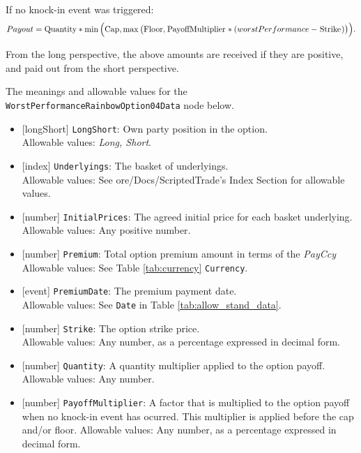 If no knock-in event was triggered:
\begin{equation*}
  Payout = \text{\lstinline!Quantity!} * \min\Big(\text{\lstinline!Cap!}, \max\big(\text{\lstinline!Floor!}, \text{\lstinline!PayoffMultiplier!} * (worstPerformance - \text{\lstinline!Strike!})\big)\Big).
\end{equation*}

From the long perspective, the above amounts are received if they are positive,
and paid out from the short perspective.

The meanings and allowable values for the \lstinline!WorstPerformanceRainbowOption04Data! node below.

\begin{itemize}
  \item{}[longShort] \lstinline!LongShort!: Own party position in the option. \\
  Allowable values: \emph{Long, Short}.
  \item{}[index] \lstinline!Underlyings!: The basket of underlyings. \\
  Allowable values: See ore/Docs/ScriptedTrade's Index Section for allowable values.
  \item{}[number] \lstinline!InitialPrices!: The agreed initial price for each basket underlying. \\
  Allowable values: Any positive number.
  \item{}[number] \lstinline!Premium!: Total option premium amount in terms of the \emph{PayCcy} \\
  Allowable values: See Table \ref{tab:currency} \lstinline!Currency!.
  \item{}[event] \lstinline!PremiumDate!: The premium payment date. \\
  Allowable values: See \lstinline!Date! in Table \ref{tab:allow_stand_data}.
  \item{}[number] \lstinline!Strike!: The option strike price. \\
  Allowable values: Any number, as a percentage expressed in decimal form.
  \item{}[number] \lstinline!Quantity!: A quantity multiplier applied to the option payoff. \\
  Allowable values: Any number.
  \item{}[number] \lstinline!PayoffMultiplier!: A factor that is multiplied to the option payoff when no knock-in event
  has ocurred. This multiplier is applied before the cap and/or floor.
  Allowable values: Any number, as a percentage expressed in decimal form.

\end{itemize}
